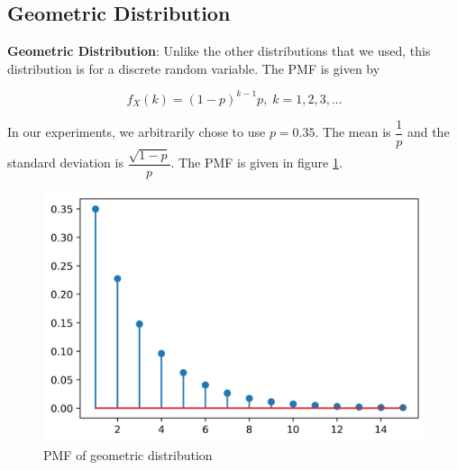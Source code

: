 \documentclass[10pt]{beamer}
\begin{document}
\begin{frame}{}
\subsection{Geometric Distribution}
 \textbf{Geometric Distribution}: Unlike the other distributions that we used, this distribution is for a discrete random variable. The PMF is given by
 \begin{block}{}
    $$f_X(k) = (1-p)^{k-1}p,\; k=1,2,3,...$$
    \end{block}
    In our experiments, we arbitrarily chose to use $p=0.35$. The mean is $\dfrac{1}{p}$ and the standard deviation is $\dfrac{\sqrt{1-p}}{p}$. The PMF is given in figure \ref{geom_pmf}. 
\end{frame}
\begin{frame}{}
    \begin{figure}[H]
        \centering
        \includegraphics[scale=0.5]{images/geometric.png}
        \caption{PMF of geometric distribution}
        \label{geom_pmf}
    \end{figure}
\end{frame}
\end{document}
